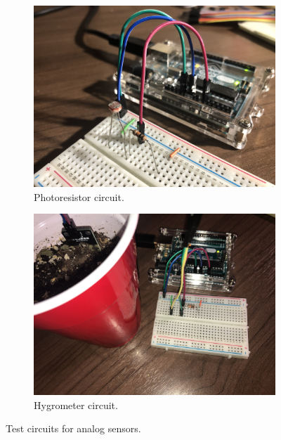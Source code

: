 \documentclass[]{article}
\begin{document}
\begin{figure}
	\centering
	\begin{subfigure}{0.48\textwidth}
		\includegraphics[width=\textwidth]{photoresistor_circuit}
		\caption{Photoresistor circuit.}
		\label{fig:photoresistor_circuit}
	\end{subfigure}
	\begin{subfigure}{0.48\textwidth}
		\includegraphics[width=\textwidth]{hygrometer_circuit}
		\caption{Hygrometer circuit.}
		\label{fig:hygrometer_circuit}
	\end{subfigure}
	\caption{Test circuits for analog sensors.}
\end{figure}
\end{document}
